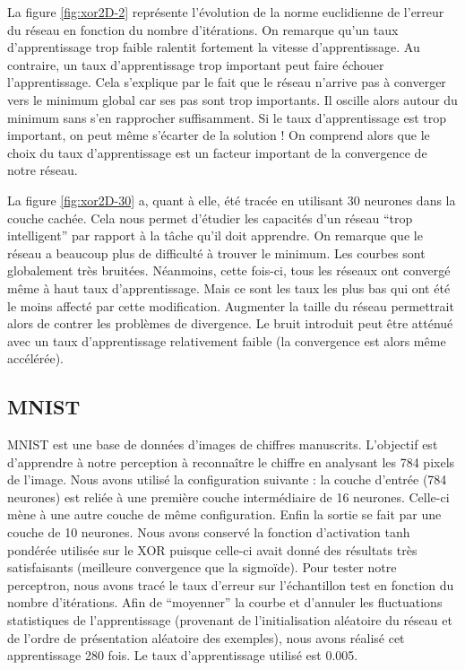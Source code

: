 La figure \ref{fig:xor2D-2} représente l'évolution de la norme euclidienne de l'erreur du réseau en fonction du nombre d'itérations. On remarque qu'un taux 
d'apprentissage trop faible ralentit fortement la vitesse d'apprentissage. Au contraire, un taux d'apprentissage trop important peut faire échouer l'apprentissage.
Cela s'explique par le fait que le réseau n'arrive pas à converger vers le minimum global car ses pas sont trop importants. Il oscille alors autour du minimum sans
s'en rapprocher suffisamment. Si le taux d'apprentissage est trop important, on peut même s'écarter de la solution ! On comprend alors que le choix du taux 
d'apprentissage est un facteur important de la convergence de notre réseau.

La figure \ref{fig:xor2D-30} a, quant à elle, été tracée en utilisant 30 neurones dans la couche cachée. Cela nous permet d'étudier les capacités d'un réseau
``trop intelligent'' par rapport à la tâche qu'il doit apprendre. On remarque que le réseau a beaucoup plus de difficulté à trouver le minimum. Les courbes sont
globalement très bruitées. Néanmoins, cette fois-ci, tous les réseaux ont convergé même à haut taux d'apprentissage. Mais ce sont les taux les plus bas qui ont été
le moins affecté par cette modification. Augmenter la taille du réseau permettrait alors de contrer les problèmes de divergence. Le bruit introduit peut être atténué
avec un taux d'apprentissage relativement faible (la convergence est alors même accélérée).

\subsection{MNIST}

MNIST est une base de données d'images de chiffres manuscrits. L'objectif est d'apprendre à notre perception à reconnaître le chiffre en analysant les 784 pixels
de l'image. Nous avons utilisé la configuration suivante : la couche d'entrée (784 neurones) est reliée à une première couche intermédiaire de 16 neurones. Celle-ci
mène à une autre couche de même configuration. Enfin la sortie se fait par une couche de 10 neurones. Nous avons conservé la fonction d'activation tanh pondérée utilisée
sur le XOR puisque celle-ci avait donné des résultats très satisfaisants (meilleure convergence que la sigmoïde).
Pour tester notre perceptron, nous avons tracé le taux d'erreur sur l'échantillon test en fonction du nombre d'itérations. Afin de ``moyenner'' la courbe et 
d'annuler les fluctuations statistiques de l'apprentissage (provenant de l'initialisation aléatoire du réseau et de l'ordre de présentation aléatoire des exemples),
nous avons réalisé cet apprentissage 280 fois. Le taux d'apprentissage utilisé est 0.005.

